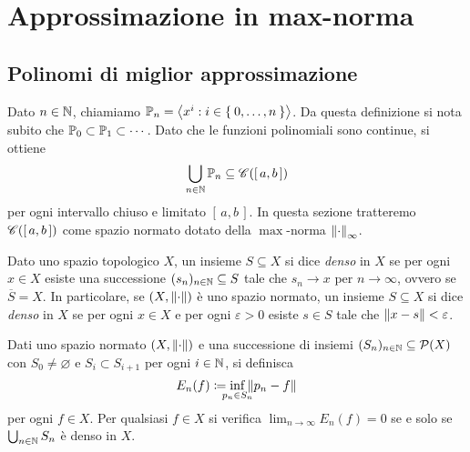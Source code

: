 \chapter{Approssimazione in max-norma}

\section{Polinomi di miglior approssimazione}

	\noindent Dato \(n \in \N\), chiamiamo \(\P_n = \Braket{x^i : i \in \Set{0, \dots, n}}\). Da questa definizione si nota subito che \(\P_0 \subset \P_1 \subset \cdots\). Dato che le funzioni polinomiali sono continue, si ottiene
	\begin{equation*}
		\bigcup_{n \in \N} \P_n \subseteq \cont ([\, a, b \,])
	\end{equation*}
	per ogni intervallo chiuso e limitato \([\, a, b \,]\). In questa sezione tratteremo \(\cont ([\, a, b\,])\) come spazio normato dotato della \(\max\)-norma \(\norm{\cdot}_\infty\).
	
	\begin{definizione}\label{def:ins-denso}
		Dato uno spazio topologico \(X\), un insieme \(S \subseteq X\) si dice \emph{denso} in \(X\) se per ogni \(x \in X\) esiste una successione \((s_n)_{n \in \N} \subseteq S\) tale che \(s_n \to x\) per \(n \to \infty\), ovvero se \(\overline{S} = X\). In particolare, se \((X, \norm{\cdot})\) è uno spazio normato, un insieme \(S \subseteq X\) si dice \emph{denso} in \(X\) se per ogni \(x \in X\) e per ogni \(\varepsilon > 0\) esiste \(s \in S\) tale che \(\norm{x - s} < \varepsilon\).
	\end{definizione}

	\begin{teorema}\label{th:errore-ins-denso}
		Dati uno spazio normato \((X, \norm{\cdot})\) e una successione di insiemi \((S_n)_{n \in \N} \subseteq \Parti (X)\) con \(S_0 \ne \varnothing\) e \(S_i \subset S_{i + 1}\) per ogni \(i \in \N\), si definisca
		\begin{equation}\label{eq:errore-approx}
			E_n (f) \coloneqq \inf_{\mathclap{p_n \in S_n}} \norm{p_n - f}
		\end{equation}
		per ogni \(f \in X\). Per qualsiasi \(f \in X\) si verifica \(\lim_{n \to \infty} E_n (f) = 0\) se e solo se \(\bigcup_{n \in \N} S_n\) è denso in \(X\).
	\end{teorema}

